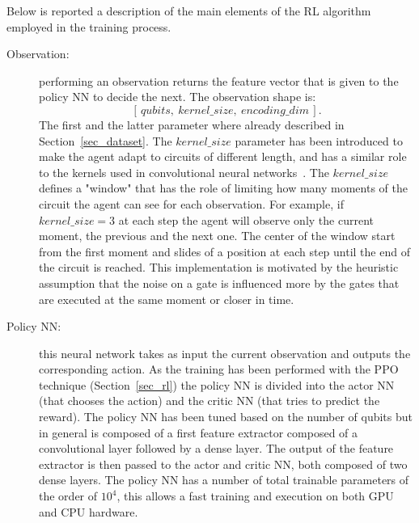 \documentclass[referee,sn-basic]{sn-jnl} %
\begin{document}
\noindent
Below is reported a description of the main elements of the RL algorithm employed in the training process.
\begin{description}
    \item[Observation:] performing an observation returns the feature vector that is given to the policy NN to decide the next. The observation shape is: 
    $$[\,qubits,\: kernel\_size,\: encoding\_dim\,].$$
    The first and the latter parameter where already described in Section~\ref{sec_dataset}. The $kernel\_size$ parameter has been introduced to make the agent adapt to circuits of different length, and has a similar role to the kernels used in convolutional neural networks~\cite{GU2018354}. The $kernel\_size$ defines a "window" that has the role of limiting how many moments of the circuit the agent can see for each observation. For example, if $kernel\_size=3$ at each step the agent will observe only the current moment, the previous and the next one. The center of the window start from the first moment and slides of a position at each step until the end of the circuit is reached. This implementation is motivated by the heuristic assumption that the noise on a gate is influenced more by the gates that are executed at the same moment or closer in time.

    \item[Policy NN:] this neural network takes as input the current observation and outputs the corresponding action. As the training has been performed with the PPO technique (Section~\ref{sec_rl}) the policy NN is divided into the actor NN (that chooses the action) and the critic NN (that tries to predict the reward). The policy NN has been tuned based on the number of qubits but in general is composed of a first feature extractor composed of a convolutional layer followed by a dense layer. The output of the feature extractor is then passed to the actor and critic NN, both composed of two dense layers. The policy NN has a number of total trainable parameters of the order of $10^4$, this allows a fast training and execution on both GPU and CPU hardware.


\end{description}
\end{document}
